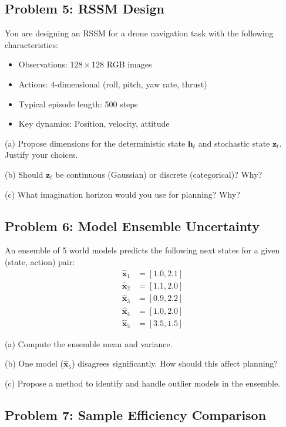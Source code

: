 \subsection{Problem 5: RSSM Design}

You are designing an RSSM for a drone navigation task with the following characteristics:
\begin{itemize}
    \item Observations: $128 \times 128$ RGB images
    \item Actions: 4-dimensional (roll, pitch, yaw rate, thrust)
    \item Typical episode length: 500 steps
    \item Key dynamics: Position, velocity, attitude
\end{itemize}

(a) Propose dimensions for the deterministic state $\mathbf{h}_t$ and stochastic state $\mathbf{z}_t$. Justify your choices.

(b) Should $\mathbf{z}_t$ be continuous (Gaussian) or discrete (categorical)? Why?

(c) What imagination horizon would you use for planning? Why?

\subsection{Problem 6: Model Ensemble Uncertainty}

An ensemble of 5 world models predicts the following next states for a given (state, action) pair:
\begin{align}
\hat{\mathbf{x}}_1 &= [1.0, 2.1] \\
\hat{\mathbf{x}}_2 &= [1.1, 2.0] \\
\hat{\mathbf{x}}_3 &= [0.9, 2.2] \\
\hat{\mathbf{x}}_4 &= [1.0, 2.0] \\
\hat{\mathbf{x}}_5 &= [3.5, 1.5]
\end{align}

(a) Compute the ensemble mean and variance.

(b) One model ($\hat{\mathbf{x}}_5$) disagrees significantly. How should this affect planning?

(c) Propose a method to identify and handle outlier models in the ensemble.

\subsection{Problem 7: Sample Efficiency Comparison}

